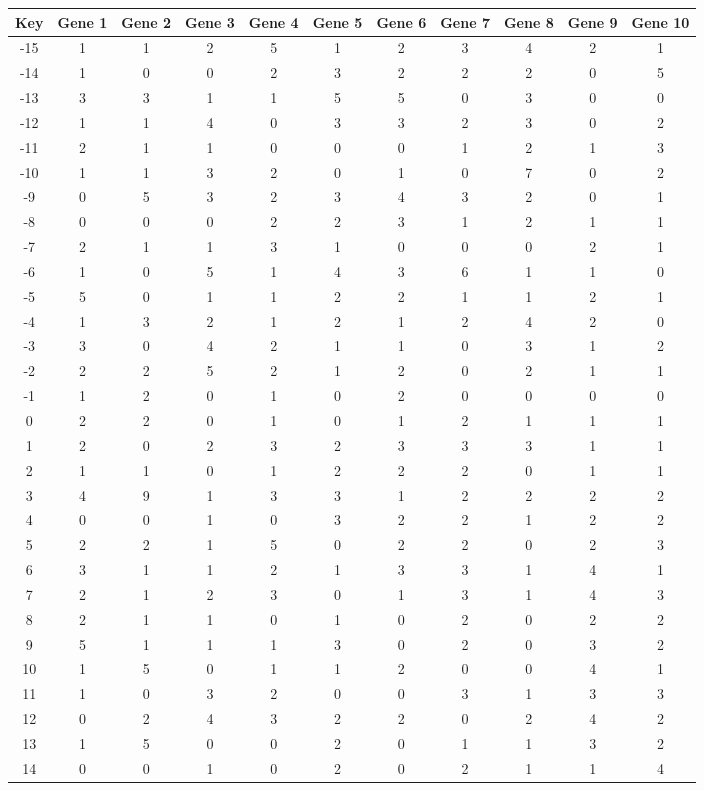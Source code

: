 \begin{tabular}{|c|c|c|c|c|c|c|c|c|c|c|}
\hline
Key & Gene 1 & Gene 2 & Gene 3 & Gene 4 & Gene 5 & Gene 6 & Gene 7 & Gene 8 & Gene 9 & Gene 10 \\
\hline
-15 & 1 & 1 & 2 & 5 & 1 & 2 & 3 & 4 & 2 & 1 \\
-14 & 1 & 0 & 0 & 2 & 3 & 2 & 2 & 2 & 0 & 5 \\
-13 & 3 & 3 & 1 & 1 & 5 & 5 & 0 & 3 & 0 & 0 \\
-12 & 1 & 1 & 4 & 0 & 3 & 3 & 2 & 3 & 0 & 2 \\
-11 & 2 & 1 & 1 & 0 & 0 & 0 & 1 & 2 & 1 & 3 \\
-10 & 1 & 1 & 3 & 2 & 0 & 1 & 0 & 7 & 0 & 2 \\
-9 & 0 & 5 & 3 & 2 & 3 & 4 & 3 & 2 & 0 & 1 \\
-8 & 0 & 0 & 0 & 2 & 2 & 3 & 1 & 2 & 1 & 1 \\
-7 & 2 & 1 & 1 & 3 & 1 & 0 & 0 & 0 & 2 & 1 \\
-6 & 1 & 0 & 5 & 1 & 4 & 3 & 6 & 1 & 1 & 0 \\
-5 & 5 & 0 & 1 & 1 & 2 & 2 & 1 & 1 & 2 & 1 \\
-4 & 1 & 3 & 2 & 1 & 2 & 1 & 2 & 4 & 2 & 0 \\
-3 & 3 & 0 & 4 & 2 & 1 & 1 & 0 & 3 & 1 & 2 \\
-2 & 2 & 2 & 5 & 2 & 1 & 2 & 0 & 2 & 1 & 1 \\
-1 & 1 & 2 & 0 & 1 & 0 & 2 & 0 & 0 & 0 & 0 \\
0 & 2 & 2 & 0 & 1 & 0 & 1 & 2 & 1 & 1 & 1 \\
1 & 2 & 0 & 2 & 3 & 2 & 3 & 3 & 3 & 1 & 1 \\
2 & 1 & 1 & 0 & 1 & 2 & 2 & 2 & 0 & 1 & 1 \\
3 & 4 & 9 & 1 & 3 & 3 & 1 & 2 & 2 & 2 & 2 \\
4 & 0 & 0 & 1 & 0 & 3 & 2 & 2 & 1 & 2 & 2 \\
5 & 2 & 2 & 1 & 5 & 0 & 2 & 2 & 0 & 2 & 3 \\
6 & 3 & 1 & 1 & 2 & 1 & 3 & 3 & 1 & 4 & 1 \\
7 & 2 & 1 & 2 & 3 & 0 & 1 & 3 & 1 & 4 & 3 \\
8 & 2 & 1 & 1 & 0 & 1 & 0 & 2 & 0 & 2 & 2 \\
9 & 5 & 1 & 1 & 1 & 3 & 0 & 2 & 0 & 3 & 2 \\
10 & 1 & 5 & 0 & 1 & 1 & 2 & 0 & 0 & 4 & 1 \\
11 & 1 & 0 & 3 & 2 & 0 & 0 & 3 & 1 & 3 & 3 \\
12 & 0 & 2 & 4 & 3 & 2 & 2 & 0 & 2 & 4 & 2 \\
13 & 1 & 5 & 0 & 0 & 2 & 0 & 1 & 1 & 3 & 2 \\
14 & 0 & 0 & 1 & 0 & 2 & 0 & 2 & 1 & 1 & 4 \\
\hline
\end{tabular}